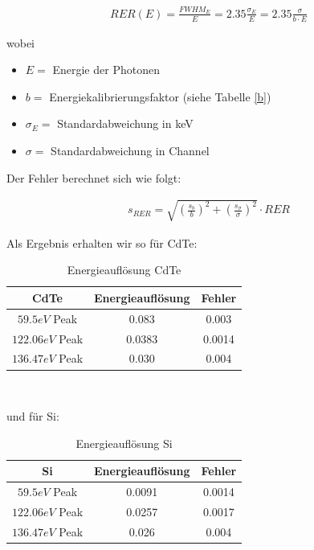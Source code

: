 \documentclass[12pt]{article}
\begin{document}
\begin{align*}
RER(E) = \frac{FWHM_E}{E}=2.35\frac{\sigma_E}{E} = 2.35\frac{\sigma}{b \cdot E}
\end{align*}

wobei 
\begin{itemize}
\item $E =$ Energie der Photonen
\item $b =$ Energiekalibrierungsfaktor (siehe Tabelle \ref{b})
\item $\sigma_E =$ Standardabweichung in keV
\item $\sigma =$  Standardabweichung in Channel 
\end{itemize}

Der Fehler berechnet sich wie folgt:

\begin{align*}
s_{RER} = \sqrt{\left(\frac{s_b}{b}\right)^2+\left(\frac{s_\sigma}{\sigma}\right)^2}\cdot RER
\end{align*}

Als Ergebnis erhalten wir so für CdTe:

\begin{table}[h!]

{\centering{}
\begin{tabular}{c||c|c}
	CdTe				& Energieauflösung & Fehler	\\ \hline\hline
$59.5 eV$ Peak		& 0.083		        & 0.003		\\ \hline
$122.06 eV$ Peak	& 0.0383		    & 0.0014	\\ \hline
$136.47 eV$ Peak	& 0.030	         	& 0.004
\end{tabular}\\}
 \caption{Energieauflösung CdTe}
\end{table}

und für Si:

\begin{table}[h!]

{\centering{}
\begin{tabular}{c||c|c}
	Si				& Energieauflösung & Fehler	\\ \hline\hline
$59.5 eV$ Peak		& 0.0091		    & 0.0014 	\\ \hline
$122.06 eV$ Peak	& 0.0257			& 0.0017	\\ \hline
$136.47 eV$ Peak	& 0.026		     	& 0.004
\end{tabular}\\}
 \caption{Energieauflösung Si}
\end{table}
\end{document}
